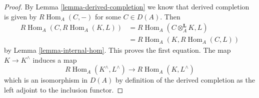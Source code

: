 \documentclass[10pt,a4paper]{amsart}
\theoremstyle{plain}
\theoremstyle{definition}
\theoremstyle{remark}
\numberwithin{equation}{subsection}
\def\Hom{\mathop{\mathrm{Hom}}\nolimits}
\begin{document}
\begin{proof}
By Lemma \ref{lemma-derived-completion} we know that derived completion is
given by $R\Hom_A(C, -)$ for some $C \in D(A)$. Then
\begin{align*}
R\Hom_A(C, R\Hom_A(K, L))
& =
R\Hom_A(C \otimes_A^\mathbf{L} K, L) \\
& =
R\Hom_A(K, R\Hom_A(C, L))
\end{align*}
by Lemma \ref{lemma-internal-hom}. This proves the first equation.
The map $K \to K^\wedge$ induces a map
$$
R\Hom_A(K^\wedge, L^\wedge) \to R\Hom_A(K, L^\wedge)
$$
which is an isomorphism in $D(A)$ by definition of the derived completion
as the left adjoint to the inclusion functor.
\end{proof}
\end{document}
